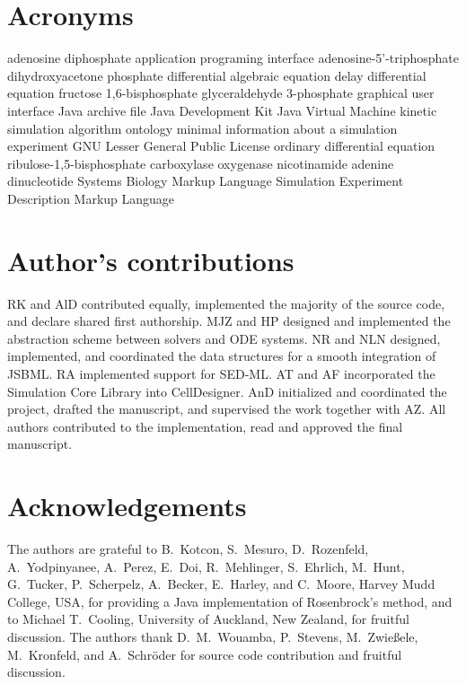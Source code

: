 \documentclass[10pt]{bmc_article}
\newenvironment{bmcformat}{\fussy\setboolean{publ}{true}}{\fussy}
\begin{document}
\begin{bmcformat}
{\section*{Acronyms}
\begin{acronym}
         {adenosine diphosphate}
         {application programing interface}
         {adenosine-5'-triphosphate}
        {dihydroxyacetone phosphate}
         {differential algebraic equation}
         {delay differential equation}
      {fructose 1,6-bisphosphate}
        {glyceraldehyde 3-phosphate}
         {graphical user interface}
         {Java archive file}
         {Java Development Kit}
         {Java Virtual Machine}
       {kinetic simulation algorithm ontology}
       {minimal information about a simulation experiment}
        {GNU Lesser General Public License}
         {ordinary differential equation}
     {ribulose-1,5-bisphosphate carboxylase oxygenase}
     {nicotinamide adenine dinucleotide}
        {Systems Biology Markup Language}
      {Simulation Experiment Description Markup Language}
\end{acronym}


\section*{Author's contributions}
RK and AlD contributed equally, implemented the majority of the source code, and declare shared first authorship.
MJZ and HP designed and implemented the abstraction scheme between solvers and \acs{ODE} systems.
NR and NLN designed, implemented, and coordinated the data structures for a smooth integration of JSBML.
RA implemented support for \acs{SED-ML}. AT and AF incorporated the Simulation Core Library into CellDesigner.
AnD initialized and coordinated the project, drafted the manuscript, and supervised the work together with AZ.
All authors contributed to the implementation, read and approved the final manuscript.    

\section*{Acknowledgements}
The authors are grateful to B.~Kotcon, S.~Mesuro, D.~Rozenfeld, A.~Yodpinyanee,
A.~Perez, E.~Doi, R.~Mehlinger, S.~Ehrlich, M.~Hunt, G.~Tucker, P.~Scherpelz,
A.~Becker, E.~Harley, and C.~Moore, Harvey Mudd College, USA, for providing a
Java implementation of Rosenbrock's method, and to Michael T.~Cooling,
University of Auckland, New Zealand, for fruitful discussion. The authors thank
D.~M.~Wouamba, P.~Stevens, M.~Zwie\ss{}ele, M.~Kronfeld, and A.~Schr\"oder for
source code contribution and fruitful discussion.

}
\end{bmcformat}
\end{document}
